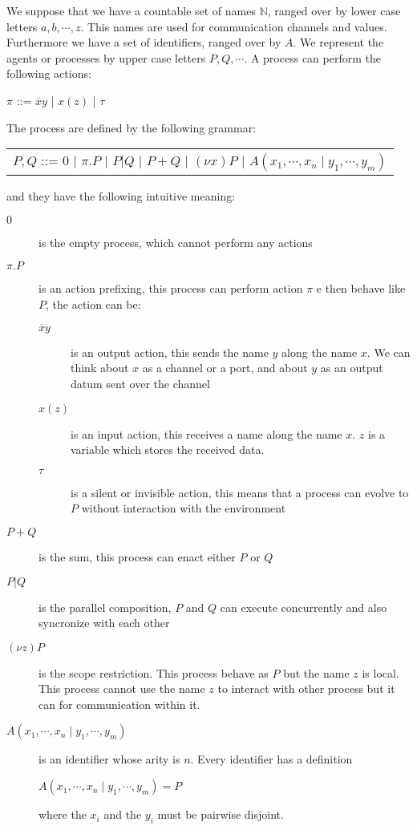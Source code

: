 We suppose that we have a countable set of names $\mathbb{N}$, ranged over by lower case letters $a,b, \cdots, z$. This names are used for communication channels and values. Furthermore we have a set of identifiers, ranged over by $A$. We represent the agents or processes by upper case letters $P,Q, \cdots $. A process can perform the following actions:
\begin{center}
  $\pi$ ::= $\overline{x}y$ | $x(z)$ | $\tau$ 
\end{center}
The process are defined by the following grammar:
\begin{center}
  \begin{tabular}{l}
    $P,Q$ ::= $0$ | $\pi.P$ | $P|Q$ | $P+Q$ | $(\nu x) P$ | $A(x_{1}, \cdots, x_{n}\; | \;y_{1}, \cdots, y_{m})$ 
  \end{tabular}
\end{center}
and they have the following intuitive meaning:
\begin{description}
  \item[$0$] 
    is the empty process, which cannot perform any actions
  \item[$\pi.P$] 
    is an action prefixing, this process can perform action $\pi$ e then behave like $P$, the action can be:
    \begin{description}
      \item[$\overline{x}y$] 
	is an output action, this sends the name $y$ along the name $x$. We can think about $x$ as a channel or a port, and about $y$ as an output datum sent over the channel
      \item[$x(z)$] 
	is an input action, this receives a name along the name $x$. $z$ is a variable which stores the received data.
      \item[$\tau$] 
	is a silent or invisible action, this means that a process can evolve to $P$ without interaction with the environment 
    \end{description}
  \item[$P+Q$] 
    is the sum, this process can enact either $P$ or $Q$
  \item[$P|Q$] 
    is the parallel composition, $P$ and $Q$ can execute concurrently and also syncronize with each other
  \item[$(\nu z) P$] 
    is the scope restriction. This process behave as $P$ but the name $z$ is local. This process cannot use the name $z$ to interact with other process but it can for communication within it.
  \item[$A(x_{1}, \cdots, x_{n}\; | \;y_{1}, \cdots, y_{m})$] 
    is an identifier whose arity is $n$. Every identifier has a definition
    \begin{center}
      $A(x_{1}, \cdots, x_{n}\; | \;y_{1}, \cdots, y_{m})=P$
    \end{center}
    where the $x_{i}$ and the $y_{i}$ must be pairwise disjoint.
\end{description}

